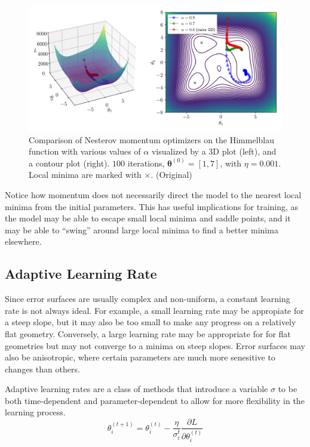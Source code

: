 \documentclass[12pt]{report}
\theoremstyle{definition}
\theoremstyle{remark}
\begin{document}
\begin{figure}[h]
    \centering
    \includegraphics[width=\linewidth]{figs/nesterov_comparison.png}
    \caption{Comparison of Nesterov momentum optimizers on the Himmelblau function with various values of $\alpha$ visualized by a 3D plot (left), and a contour plot (right). $100$ iterations, $\boldsymbol{\theta}^{(0)} = [1,7]$, with $\eta = 0.001$. Local minima are marked with $\times$. (Original)}
    \label{fig:enter-label}
\end{figure}
Notice how momentum does not necessarily direct the model to the nearest local minima from the initial parameters. This has useful implications for training, as the model may be able to escape small local minima and saddle points, and it may be able to ``swing'' around large local minima to find a better minima elsewhere.

\subsection{Adaptive Learning Rate}
Since error surfaces are usually complex and non-uniform, a constant learning rate is not always ideal. For example, a small learning rate may be appropiate for a steep slope, but it may also be too small to make any progress on a relatively flat geometry. Conversely, a large learning rate may be appropriate for for flat geometries but may not converge to a minima on steep slopes. Error surfaces may also be anisotropic, where certain parameters are much more senesitive to changes than others.

Adaptive learning rates are a class of methods that introduce a variable $\sigma$ to be both time-dependent and parameter-dependent to allow for more flexibility in the learning process.
\begin{equation}
    \theta_{i}^{(t+1)} = \theta_{i}^{(t)} - \frac{\eta}{\sigma_i^t}\frac{\partial L}{\partial \theta_i^{(t)}}
\end{equation}
\end{document}
